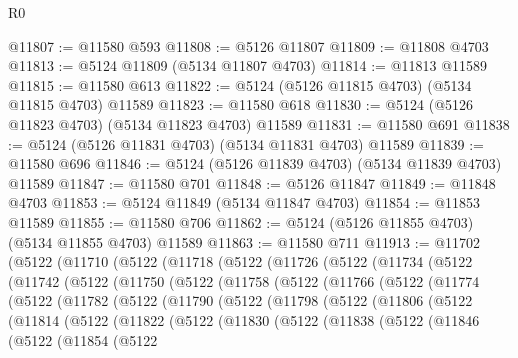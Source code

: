 \begin{lexlean}{R0}
\begin{coremodule}
@11807 := @11580 @593
@11808 := @5126 @11807
@11809 := @11808 @4703
@11813 := @5124 @11809 (@5134 @11807 @4703)
@11814 := @11813 @11589
@11815 := @11580 @613
@11822 := @5124 (@5126 @11815 @4703) (@5134 @11815 @4703) @11589
@11823 := @11580 @618
@11830 := @5124 (@5126 @11823 @4703) (@5134 @11823 @4703) @11589
@11831 := @11580 @691
@11838 := @5124 (@5126 @11831 @4703) (@5134 @11831 @4703) @11589
@11839 := @11580 @696
@11846 := @5124 (@5126 @11839 @4703) (@5134 @11839 @4703) @11589
@11847 := @11580 @701
@11848 := @5126 @11847
@11849 := @11848 @4703
@11853 := @5124 @11849 (@5134 @11847 @4703)
@11854 := @11853 @11589
@11855 := @11580 @706
@11862 := @5124 (@5126 @11855 @4703) (@5134 @11855 @4703) @11589
@11863 := @11580 @711
@11913 := @11702
    (@5122
      (@11710
        (@5122
          (@11718
            (@5122
              (@11726
                (@5122
                  (@11734
                    (@5122
                      (@11742
                        (@5122
                          (@11750
                            (@5122
                              (@11758
                                (@5122
                                  (@11766
                                    (@5122
                                      (@11774
                                        (@5122
                                          (@11782
                                            (@5122
                                              (@11790
                                                (@5122
                                                  (@11798
                                                    (@5122
                                                      (@11806
                                                        (@5122
                                                          (@11814
                                                            (@5122
                                                              (@11822
                                                                (@5122
                                                                  (@11830
                                                                    (@5122
                                                                      (@11838
                                                                        (@5122
                                                                          (@11846
                                                                            (@5122
                                                                              (@11854
                                                                                (@5122

\end{coremodule}
\end{lexlean}
